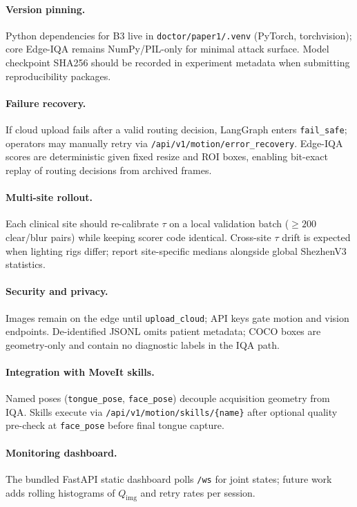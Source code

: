 \paragraph{Version pinning.}
Python dependencies for B3 live in \texttt{doctor/paper1/.venv} (PyTorch, torchvision); core Edge-IQA remains NumPy/PIL-only for minimal attack surface.
Model checkpoint SHA256 should be recorded in experiment metadata when submitting reproducibility packages.

\paragraph{Failure recovery.}
If cloud upload fails after a valid routing decision, LangGraph enters \texttt{fail\_safe}; operators may manually retry via \texttt{/api/v1/motion/error\_recovery}.
Edge-IQA scores are deterministic given fixed resize and ROI boxes, enabling bit-exact replay of routing decisions from archived frames.

\paragraph{Multi-site rollout.}
Each clinical site should re-calibrate $\tau$ on a local validation batch ($\geq 200$ clear/blur pairs) while keeping scorer code identical.
Cross-site $\tau$ drift is expected when lighting rigs differ; report site-specific medians alongside global ShezhenV3 statistics.

\paragraph{Security and privacy.}
Images remain on the edge until \texttt{upload\_cloud}; API keys gate motion and vision endpoints.
De-identified JSONL omits patient metadata; COCO boxes are geometry-only and contain no diagnostic labels in the IQA path.

\paragraph{Integration with MoveIt skills.}
Named poses (\texttt{tongue\_pose}, \texttt{face\_pose}) decouple acquisition geometry from IQA.
Skills execute via \texttt{/api/v1/motion/skills/\{name\}} after optional quality pre-check at \texttt{face\_pose} before final tongue capture.

\paragraph{Monitoring dashboard.}
The bundled FastAPI static dashboard polls \texttt{/ws} for joint states; future work adds rolling histograms of $Q_{\mathrm{img}}$ and retry rates per session.

